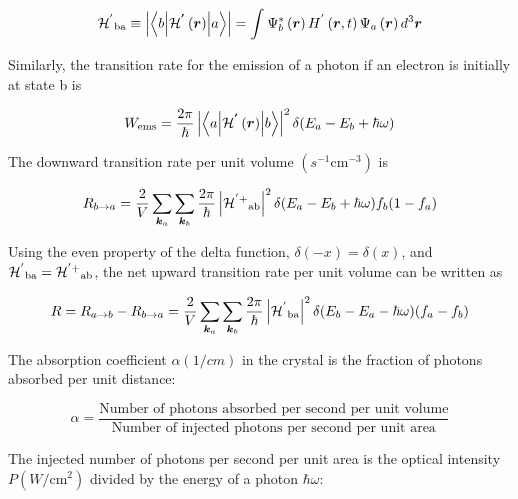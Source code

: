 \begin{equation}
{\mathcal{H}^{'}}_{\text{ba}} \equiv \left| \left\langle b \middle| \mathcal{H}^{\bm{'}}\left( \bm{r} \right) \middle| a \right\rangle \right| = \int_{}^{}{\Psi_{b}^{*}\left( \bm{r} \right)H^{'}\left( \bm{r},t \right)\Psi_{a}\left( \bm{r} \right)d^{3}\bm{r}}
\end{equation}

Similarly, the transition rate for the emission of a photon if an
electron is initially at state b is

\begin{equation}
W_{\text{ems}} = \frac{2\pi}{\hbar}\left| \left\langle a \middle| \mathcal{H}^{\bm{'}}\left( \bm{r} \right) \middle| b \right\rangle \right|^{2}\delta(E_{a} - E_{b} + \hbar\omega)
\end{equation}

The downward transition rate per unit volume
\((s^{- 1}\text{cm}^{- 3})\) is

\begin{equation}
R_{b \rightarrow a} = \frac{2}{V}\sum_{\bm{k}_{a}}^{}{\sum_{\bm{k}_{b}}^{}\frac{2\pi}{\hbar}}\left| {\mathcal{H}^{' +}}_{\text{ab}} \right|^{2}\delta(E_{a} - E_{b} + \hbar\omega)f_{b}(1 - f_{a})
\end{equation}

Using the even property of the delta function,
\(\delta\left( - x \right) = \delta\left( x \right)\), and
\({\mathcal{H}^{'}}_{\text{ba}} = {\mathcal{H}^{' +}}_{\text{ab}}\), the net upward
transition rate per unit volume can be written as

\begin{equation}
R = R_{a \rightarrow b} - R_{b \rightarrow a} = \frac{2}{V}\sum_{\bm{k}_{a}}^{}{\sum_{\bm{k}_{b}}^{}\frac{2\pi}{\hbar}}\left| {\mathcal{H}^{'}}_{\text{ba}} \right|^{2}\delta(E_{b} - E_{a} - \hbar\omega)(f_{a} - f_{b})
\end{equation}

The absorption coefficient \(\alpha(1/cm)\) in the crystal is the
fraction of photons absorbed per unit distance:

\begin{equation}
\alpha = \frac{\text{Number\ of\ photons\ absorbed\ per\ second\ per\ unit\ volume}}{\text{Number\ of\ injected\ photons\ per\ second\ per\ unit\ area}}
\end{equation}

The injected number of photons per second per unit area is the optical
intensity \(P(W/\text{cm}^{2})\) divided by the energy of a photon
\(\hbar\omega\):

